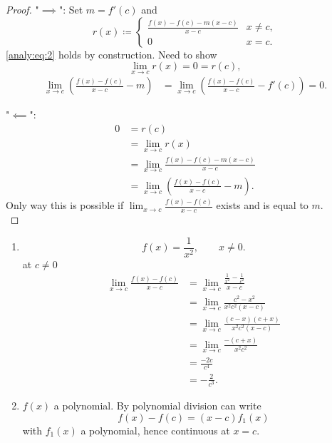 \documentclass[10pt, a4paper]{article}
\begin{document}
\begin{lemma}[continues = analy:lem:firstordertaylor]
    \begin{proof}
        "$\implies$":
        Set $m = f'(c)$ and
        \[
        r(x) \coloneqq \begin{cases}
            \frac{f(x) - f(c) - m(x - c)}{x - c} & x \neq c, \\
            0 & x = c.
        \end{cases}
        \]
        \eqref{analy:eq:2} holds by construction.
        Need to show
        \[
        \lim_{x \rightarrow c}r(x) = 0 = r(c),
        \]
        \begin{align*}
            \lim_{x \rightarrow c}\left(\frac{f(x) - f(c)}{x - c} - m\right) &= \lim_{x \rightarrow c}\left(\frac{f(x) - f(c)}{x - c} - f'(c)\right) = 0.
        \end{align*}

        "$\impliedby$":
        \begin{align*}
            0 &= r(c) \\
            &= \lim_{x \rightarrow c}r(x) \\
            &= \lim_{x \rightarrow c}\frac{f(x) - f(c) - m(x - c)}{x - c} \\
            &= \lim_{x \rightarrow c}\left(\frac{f(x) - f(c)}{x - c} - m\right).
        \end{align*}
        Only way this is possible if $\lim_{x \rightarrow c}\frac{f(x) - f(c)}{x - c}$ exists and is equal to $m$.
        \[
        \]
    \end{proof}
\end{lemma}

\begin{example}
    \begin{enumerate}[label = (\roman*)]
        \item 
        \[
        f(x) = \frac{1}{x ^ 2},\qquad x \neq 0.
        \]
        at $c \neq 0$
        \begin{align*}
            \lim_{x \rightarrow c}\frac{f(x) - f(c)}{x - c} &= \lim_{x \rightarrow c}\frac{\frac{1}{x ^ 2} - \frac{1}{c ^ 2}}{x - c} \\
            &= \lim_{x \rightarrow c}\frac{c ^ 2 - x ^ 2}{x ^ 2c ^ 2(x - c)} \\
            &= \lim_{x \rightarrow c}\frac{(c - x)(c + x)}{x ^ 2c ^ 2(x - c)} \\
            &= \lim_{x \rightarrow c}\frac{-(c + x)}{x ^ 2c ^ 2} \\
            &= \frac{-2c}{c ^ 4} \\
            &= -\frac{2}{c ^ 3}.
        \end{align*}

        \item $f(x)$ a polynomial.
        By polynomial division can write
        \[
        f(x) - f(c) = (x - c)f_1(x)
        \]
        with $f_1(x)$ a polynomial,
        hence continuous at $x = c$.
    \end{enumerate}
\end{example}
\end{document}
